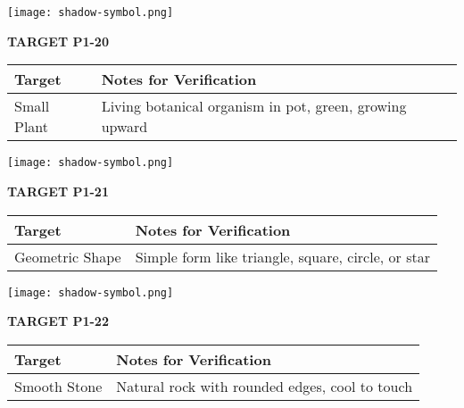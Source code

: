 \documentclass[10pt,twoside,final]{book} %
\makeatletter
\newcommand{\cleardoublepageWithSymbol}{%
  \clearpage %
  \if@twoside %
    \ifodd\c@page %
    \else %
      \thispagestyle{fancy} %
      \begingroup %
        \vspace*{0pt} %
        \vfill %
        \centering %
        \noindent 
        \texttt{[image: shadow-symbol.png]}
        \vfill %
      \endgroup
      \newpage    %
      \if@twocolumn\if@firstcolumn\else\hbox{}\newpage\fi\fi
    \fi
  \fi
}
\makeatother
\begin{document}
\cleardoublepageWithSymbol
\label{target:P1-20}
\begin{center}
\Large\textbf{TARGET P1-20}
\end{center}
\begin{mdframed}[backgroundcolor=white, linewidth=0.7pt, linecolor=rvprimary, shadow=true, shadowsize=1pt, shadowcolor=graydark!40, roundcorner=3pt]
\begin{tabular}{|p{3.5cm}|p{9cm}|}
\hline
\rowcolor{rvprimary!15}
\textbf{Target} & \textbf{Notes for Verification} \\
\hline
Small Plant & Living botanical organism in pot, green, growing upward \\
\hline
\end{tabular}
\end{mdframed}


\cleardoublepageWithSymbol
\label{target:P1-21}
\begin{center}
\Large\textbf{TARGET P1-21}
\end{center}
\begin{mdframed}[backgroundcolor=white, linewidth=0.7pt, linecolor=rvprimary, shadow=true, shadowsize=1pt, shadowcolor=graydark!40, roundcorner=3pt]
\begin{tabular}{|p{3.5cm}|p{9cm}|}
\hline
\rowcolor{rvprimary!15}
\textbf{Target} & \textbf{Notes for Verification} \\
\hline
Geometric Shape & Simple form like triangle, square, circle, or star \\
\hline
\end{tabular}
\end{mdframed}


\cleardoublepageWithSymbol
\label{target:P1-22}
\begin{center}
\Large\textbf{TARGET P1-22}
\end{center}
\begin{mdframed}[backgroundcolor=white, linewidth=0.7pt, linecolor=rvprimary, shadow=true, shadowsize=1pt, shadowcolor=graydark!40, roundcorner=3pt]
\begin{tabular}{|p{3.5cm}|p{9cm}|}
\hline
\rowcolor{rvprimary!15}
\textbf{Target} & \textbf{Notes for Verification} \\
\hline
Smooth Stone & Natural rock with rounded edges, cool to touch \\
\hline
\end{tabular}
\end{mdframed}
\end{document}
